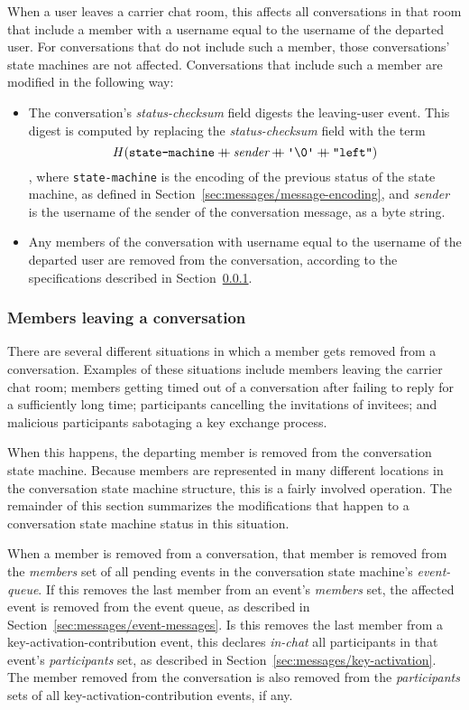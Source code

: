 \documentclass{article}
\def\field#1{\textit{#1}}
\def\smfield#1{\textsl{#1}}
\def\type#1{\textsf{#1}}
\def\concat{\mathbin{+\!\!\!+}}
\begin{document}
When a user leaves a carrier chat room, this affects all conversations in that room that include a member with a username equal to the username of the departed user.
For conversations that do not include such a member, those conversations' state machines are not affected.
Conversations that include such a member are modified in the following way:
\begin{itemize}
\item The conversation's \smfield{status-checksum} field digests the leaving-user event. This digest is computed by replacing the \smfield{status-checksum} field with the term
$$H(\texttt{state-machine} \concat \field{sender} \concat \texttt{\textquotesingle \char`\\ 0\textquotesingle} \concat \texttt{"{}left"{}})$$
, where \texttt{state-machine} is the encoding of the previous status of the state machine, as defined in Section~\ref{sec:messages/message-encoding}, and \field{sender} is the username of the sender of the conversation message, as a byte string.
\item Any members of the conversation with username equal to the username of the departed user are removed from the conversation, according to the specifications described in Section~\ref{sec:conversation-state-machine/operations/removing}.
\end{itemize}


\subsubsection{Members leaving a conversation}
\label{sec:conversation-state-machine/operations/removing}

There are several different situations in which a member gets removed from a conversation.
Examples of these situations include members leaving the carrier chat room; members getting timed out of a conversation after failing to reply for a sufficiently long time; participants cancelling the invitations of invitees; and malicious participants sabotaging a key exchange process.

When this happens, the departing member is removed from the conversation state machine.
Because members are represented in many different locations in the conversation state machine structure, this is a fairly involved operation.
The remainder of this section summarizes the modifications that happen to a conversation state machine status in this situation.

When a member is removed from a conversation, that member is removed from the \smfield{members} set of all pending events in the conversation state machine's \smfield{event-queue}.
If this removes the last member from an event's \smfield{members} set, the affected event is removed from the event queue, as described in Section~\ref{sec:messages/event-messages}.
Is this removes the last member from a \type{key-activation-contribution} event, this declares \smfield{in-chat} all participants in that event's \smfield{participants} set, as described in Section~\ref{sec:messages/key-activation}.
The member removed from the conversation is also removed from the \smfield{participants} sets of all \type{key-activation-contribution} events, if any.
\end{document}
